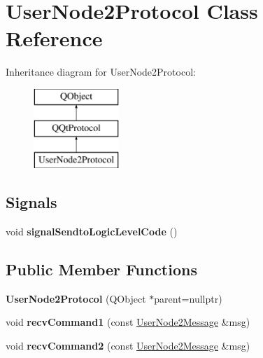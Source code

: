 \hypertarget{class_user_node2_protocol}{}\section{User\+Node2\+Protocol Class Reference}
\label{class_user_node2_protocol}
Inheritance diagram for User\+Node2\+Protocol\+:\begin{figure}[H]
\begin{center}
\leavevmode
\includegraphics[height=3.000000cm]{class_user_node2_protocol}
\end{center}
\end{figure}
\subsection*{Signals}
\begin{DoxyCompactItemize}
\item 
\mbox{\label{class_user_node2_protocol_a0a63943e5e1535596f1daa0f1597b78c}} 
void {\bfseries signal\+Sendto\+Logic\+Level\+Code} ()
\end{DoxyCompactItemize}
\subsection*{Public Member Functions}
\begin{DoxyCompactItemize}
\item 
\mbox{\label{class_user_node2_protocol_ae556708b69b0c7978b23826f5fa37838}} 
{\bfseries User\+Node2\+Protocol} (Q\+Object $\ast$parent=nullptr)
\item 
\mbox{\label{class_user_node2_protocol_ae8e9154d5180ae33b76e0104f933e8d0}} 
void {\bfseries recv\+Command1} (const \mbox{\hyperlink{class_user_node2_message}{User\+Node2\+Message}} \&msg)
\item 
\mbox{\label{class_user_node2_protocol_a5ca60e631151f2eacc2aab4688a2e54b}} 
void {\bfseries recv\+Command2} (const \mbox{\hyperlink{class_user_node2_message}{User\+Node2\+Message}} \&msg)
\end{DoxyCompactItemize}

